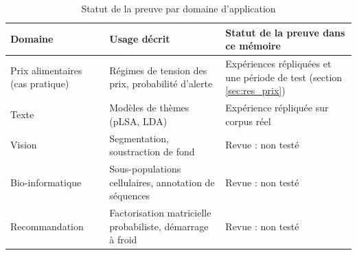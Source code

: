 \begin{table}[H]
\centering
\small
\setlength{\tabcolsep}{0.14cm}
\begin{tabular}{|p{3.6cm}|p{5.4cm}|p{5.2cm}|}
\hline
\textbf{Domaine} & \textbf{Usage décrit} & \textbf{Statut de la preuve dans ce mémoire} \\
\hline
Prix alimentaires (cas pratique) & Régimes de tension des prix, probabilité d'alerte & Expériences répliquées et une période de test (section \ref{sec:res_prix}) \\
\hline
Texte & Modèles de thèmes (pLSA, LDA) & Expérience répliquée sur corpus réel \\
\hline
Vision & Segmentation, soustraction de fond & Revue : non testé \\
\hline
Bio-informatique & Sous-populations cellulaires, annotation de séquences & Revue : non testé \\
\hline
Recommandation & Factorisation matricielle probabiliste, démarrage à froid & Revue : non testé \\
\hline
\end{tabular}
\caption{Statut de la preuve par domaine d'application}
\label{tab:3_1}
\end{table}

